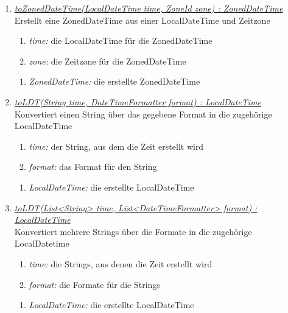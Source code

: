 \begin{enumerate}[+]
\item \underline{\textit{toZonedDateTime(LocalDateTime time, ZoneId zone) : ZonedDateTime}}\\
Erstellt eine ZonedDateTime aus einer LocalDateTime und Zeitzone

\begin{enumerate}[$\bullet$]
\item \textit{time:} die LocalDateTime für die ZonedDateTime
\item \textit{zone:} die Zeitzone für die ZonedDateTime
\end{enumerate}
\vspace{-0.2cm}
\begin{enumerate}[$\circ$]
\item \textit{ZonedDateTime:} die erstellte ZonedDateTime
\end{enumerate}

\item \underline{\textit{toLDT(String time, DateTimeFormatter format) : LocalDateTime}}\\
Konvertiert einen String über das gegebene Format in die zugehörige LocalDateTime

\begin{enumerate}[$\bullet$]
\item \textit{time:} der String, aus dem die Zeit erstellt wird
\item \textit{format:} das Format für den String
\end{enumerate}
\vspace{-0.2cm}
\begin{enumerate}[$\circ$]
\item \textit{LocalDateTime:} die erstellte LocalDateTime
\end{enumerate}

\item \underline{\textit{toLDT(List<String> time, List<DateTimeFormatter> format) : LocalDateTime}}\\
Konvertiert mehrere Strings über die Formate in die zugehörige LocalDatetime

\begin{enumerate}[$\bullet$]
\item \textit{time:} die Strings, aus denen die Zeit erstellt wird
\item \textit{format:} die Formate für die Strings
\end{enumerate}
\vspace{-0.2cm}
\begin{enumerate}[$\circ$]
\item \textit{LocalDateTime:} die erstellte LocalDateTime
\end{enumerate}


\end{enumerate}
